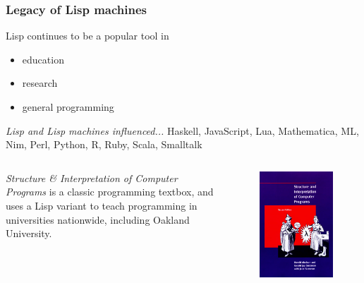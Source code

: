 \documentclass{beamer}
\begin{document}
\begin{frame}
	\frametitle{Legacy of Lisp machines}
	Lisp continues to be a popular tool in
	\begin{itemize}
		\item education
		\item research
		\item general programming\newline
	\end{itemize}
	
		\textit{Lisp and Lisp machines influenced...}
		Haskell, JavaScript, Lua, Mathematica, ML, Nim,  Perl, Python, R, Ruby, Scala, Smalltalk
	
		\begin{columns}[c] %
			
	
	\textit{Structure \& Interpretation of Computer Programs} is a classic programming textbox,  and uses a Lisp variant to teach programming in universities nationwide, including Oakland University.\newline
	

			
			
			\begin{figure}
				\includegraphics[width=1\linewidth]{../img/SICP}
			\end{figure}
			

\end{columns}
\end{frame}
\end{document}

